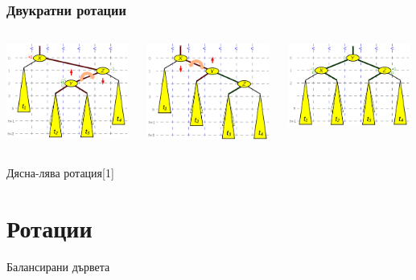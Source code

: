 \documentclass{beamer}
\begin{document}
\begin{frame}[fragile]
  \frametitle{Двукратни ротации}
    
  \begin{columns}[t]
    \begin{column}{0.33\textwidth}
        \includegraphics[width=4cm]{images/bal_tree_right_left_rotation_1}
    \end{column}
    \begin{column}{0.33\textwidth}
         \includegraphics[width=4cm]{images/bal_tree_right_left_rotation_2}
    \end{column}
    \begin{column}{0.33\textwidth}
      \includegraphics[width=4cm]{images/bal_tree_right_left_rotation_3}
 \end{column}
\end{columns}
  \centerline{Дясна-лява ротация[1]}
  
  \end{frame}
  

  \section{Ротации}

  \begin{frame}
    \centerline{Балансирани дървета}
  \end{frame}
    
\end{document}
